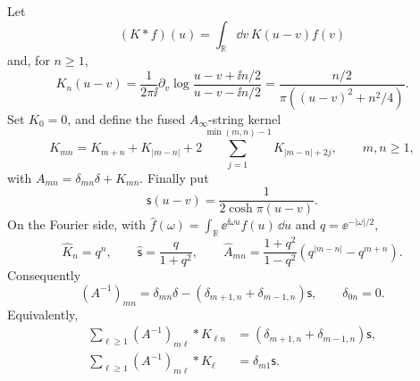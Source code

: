 \begin{lemma}
\label{lem:planar-n4-auxiliary-kernel-inverse}
Let
\[
  (K*f)(u)=\int_{\mathbb R}\dd v\,K(u-v)f(v)
\]
and, for \(n\geq 1\),
\begin{equation}
  K_n(u-v)
  =
  \frac{1}{2\pi\ii}\partial_v
  \log\frac{u-v+\ii n/2}{u-v-\ii n/2}
  =
  \frac{n/2}{\pi((u-v)^2+n^2/4)} .
  \label{eq:planar-n4-rational-string-kernel}
\end{equation}
Set \(K_0=0\), and define the fused \(A_\infty\)-string kernel
\[
  K_{mn}
  =
  K_{m+n}+K_{\lvert m-n\rvert}
  +
  2\sum_{j=1}^{\min(m,n)-1}K_{\lvert m-n\rvert+2j},
  \qquad m,n\geq 1,
\]
with \(A_{mn}=\delta_{mn}\delta+K_{mn}\).  Finally put
\[
  \mathsf s(u-v)=\frac{1}{2\cosh\pi(u-v)} .
\]
On the Fourier side, with
\(\widehat f(\omega)=\int_{\mathbb R}\ee^{\ii\omega u}f(u)\,\dd u\) and
\(q=\ee^{-|\omega|/2}\),
\begin{equation}
  \widehat K_n=q^n,\qquad
  \widehat{\mathsf s}=\frac{q}{1+q^2},\qquad
  \widehat A_{mn}
  =
  \frac{1+q^2}{1-q^2}\left(q^{|m-n|}-q^{m+n}\right).
  \label{eq:planar-n4-a-kernel-fourier-symbol}
\end{equation}
Consequently
\begin{equation}
  (A^{-1})_{mn}
  =
  \delta_{mn}\delta
  -
  (\delta_{m+1,n}+\delta_{m-1,n})\mathsf s,
  \qquad \delta_{0n}=0.
  \label{eq:planar-n4-a-kernel-inverse}
\end{equation}
Equivalently,
\begin{align}
  \sum_{\ell\geq 1}(A^{-1})_{m\ell}*K_{\ell n}
  &=
  (\delta_{m+1,n}+\delta_{m-1,n})\mathsf s,
  \label{eq:planar-n4-a-inverse-kmn}\\
  \sum_{\ell\geq 1}(A^{-1})_{m\ell}*K_\ell
  &=
  \delta_{m1}\mathsf s .
  \label{eq:planar-n4-a-inverse-kn}
\end{align}
\end{lemma}

